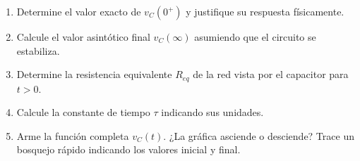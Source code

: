 \documentclass[11pt, a4paper]{article}
\begin{document}
\begin{enumerate}\setlength\itemsep{1.8cm}
    \item Determine el valor exacto de $v_C(0^+)$ y justifique su respuesta físicamente.
    \item Calcule el valor asintótico final $v_C(\infty)$ asumiendo que el circuito se estabiliza.
    \item Determine la resistencia equivalente $R_{eq}$ de la red vista por el capacitor para $t > 0$.
    \item Calcule la constante de tiempo $\tau$ indicando sus unidades.
    \item Arme la función completa $v_C(t)$. ¿La gráfica asciende o desciende? Trace un bosquejo rápido indicando los valores inicial y final.
\end{enumerate}
\end{document}
